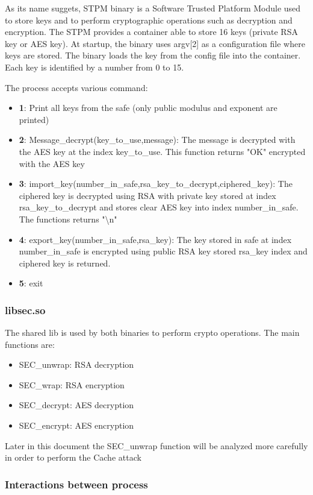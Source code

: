 \documentclass[a4paper]{article}
\begin{document}
As its name suggets, STPM binary is a Software Trusted Platform Module used to store keys and to perform cryptographic operations such as decryption and encryption.
The STPM provides a container able to store 16 keys (private RSA key or AES key). At startup, the binary uses argv[2] as a configuration file where keys are stored. The binary loads the key from the config file into the container. Each key is identified by a number from 0 to 15.\newline

The process accepts various command:
\begin{itemize}
\item \textbf{1}: Print all keys from the safe (only public modulus and exponent are printed)
\item \textbf{2}: Message\_decrypt(key\_to\_use,message): The message is decrypted with the AES key at the index key\_to\_use. This function returns "OK" encrypted with the AES key
\item \textbf{3}: import\_key(number\_in\_safe,rsa\_key\_to\_decrypt,ciphered\_key): The ciphered key is decrypted using RSA with private key stored at index rsa\_key\_to\_decrypt and stores clear AES key into index number\_in\_safe. The functions returns "\textbackslash{}n"
\item \textbf{4}: export\_key(number\_in\_safe,rsa\_key): The key stored in safe at index number\_in\_safe is encrypted using public RSA key stored rsa\_key index and ciphered key is returned.
\item \textbf{5}: exit
\end{itemize}

\subsubsection{libsec.so}
The  shared lib is used by both binaries to perform crypto operations. The main functions are: 
\begin{itemize}
\item SEC\_unwrap: RSA decryption
\item SEC\_wrap: RSA encryption
\item SEC\_decrypt: AES decryption
\item SEC\_encrypt: AES encryption
\end{itemize}

Later in this document the SEC\_unwrap function will be analyzed more carefully in order to perform the Cache attack

\subsubsection{Interactions between process}
\end{document}
